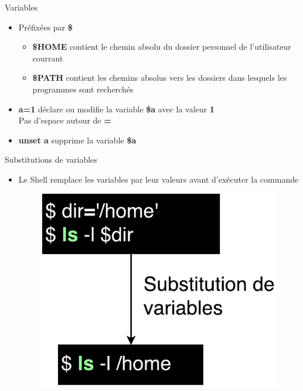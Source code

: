 \documentclass[xcolor=table]{beamer}
\begin{document}
\begin{frame}{Variables}
\begin{itemize}
    \item Préfixées par \textbf{\$}
    \begin{itemize}
        \item \textbf{\$HOME} contient le chemin absolu du dossier personnel de l'utilisateur courrant
        \item \textbf{\$PATH} contient les chemins absolus vers les dossiers dans lesquels les programmes sont recherchés
    \end{itemize}
    \item \textbf{a=1} déclare ou modifie la variable \textbf{\$a} avec la valeur \textbf{1}\\
    Pas d'espace autour de \textbf{=}
    \item \textbf{unset a} supprime la variable \textbf{\$a}
\end{itemize}
\end{frame}

\begin{frame}{Substitutions de variables}
\begin{itemize}
    \item Le Shell remplace les variables par leur valeurs avant d'exécuter la commande
    \begin{figure}
        \includegraphics[scale=0.5]{fig/var-substitution.pdf}
    \end{figure}
\end{itemize}
\end{frame}
\end{document}
